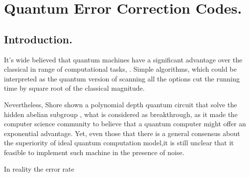\chapter{Quantum Error Correction Codes.}
\section{Introduction.}
It's wide believed that quantum machines have a significant advantage over the classical in range of computational tasks\cite{grover1996fast}, \cite{ahuja1999quantum}. Simple algorithms, which could be interpreted as the quantum version of scanning all the options cut the running time by square root of the classical magnitude. 

Nevertheless, Shore shown a polynomial depth quantum circuit that solve the hidden abelian subgroup \cite{Shor_1997}, what is considered as breakthrough, as it made the computer science community to believe that a quantum computer might offer an exponential advantage. Yet, even those that there is a general consensus about the superiority of ideal quantum computation model,it is still unclear that it feasible to implement such machine in the presence of noise.    

In reality the error rate      

 
